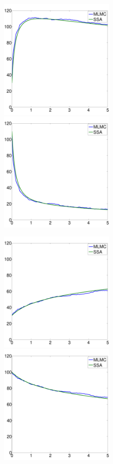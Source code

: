 \documentclass[ugrad,lot,lof,openright,11pt,oneside,onehalfspace]{RUthesis}
\begin{document}
			\begin{figure}[H]
			\centerline{
				\includegraphics[width=0.5\textwidth]{figures/GKS_c1_mlmc.pdf}
				\includegraphics[width=0.5\textwidth]{figures/GKS_s_mlmc.pdf}
				}
			\centerline{
				\includegraphics[width=0.5\textwidth]{figures/GKS_c2_mlmc.pdf}
				\includegraphics[width=0.5\textwidth]{figures/GKS_e2_mlmc.pdf}
}
\end{figure}
\end{document}
